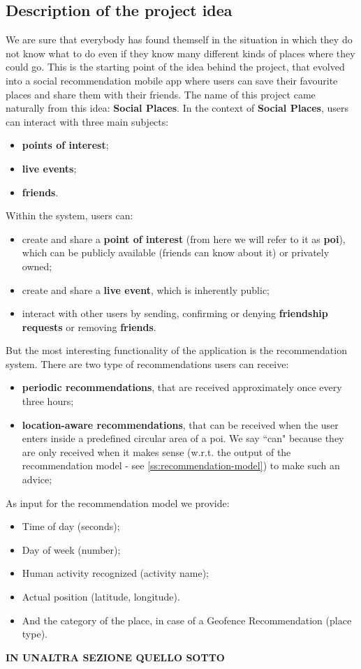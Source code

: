 \documentclass[../../main]{subfiles}
\begin{document}
\label{ss:description-project-idea}
\subsection{Description of the project idea}
We are sure that everybody has found themself in the situation in which they do not know what to do even if they know many different kinds of places where they could go.
This is the starting point of the idea behind the project, that evolved into a social recommendation mobile app where users can save their favourite places and share them with their friends.
The name of this project came naturally from this idea: \textbf{Social Places}.
In the context of \textbf{Social Places}, users can interact with three main subjects:
\begin{itemize}
    \item \textbf{points of interest};
    \item \textbf{live events};
    \item \textbf{friends}.
\end{itemize}
Within the system, users can:
\begin{itemize}
    \item create and share a \textbf{point of interest} (from here we will refer to it as \textbf{poi}), which can be publicly available (friends can know about it) or privately owned;
    \item create and share a \textbf{live event}, which is inherently public;
    \item interact with other users by sending, confirming or denying \textbf{friendship requests} or removing \textbf{friends}.
\end{itemize}
But the most interesting functionality of the application is the recommendation system.
There are two type of recommendations users can receive:
\begin{itemize}
    \item \textbf{periodic recommendations}, that are received approximately once every three hours;
    \item \textbf{location-aware recommendations}, that can be received when the user enters inside a predefined circular area of a poi.
    We say ``can" because they are only received when it makes sense (w.r.t. the output of the recommendation model - see \ref{ss:recommendation-model}) to make such an advice;
\end{itemize}
As input for the recommendation model we provide:
\begin{itemize}
    \item Time of day (seconds);
    \item Day of week (number);
    \item Human activity recognized (activity name);
    \item Actual position (latitude, longitude).
    \item And the category of the place, in case of a Geofence Recommendation (place type).
\end{itemize}
\textbf{IN UNALTRA SEZIONE QUELLO SOTTO}
\end{document}
